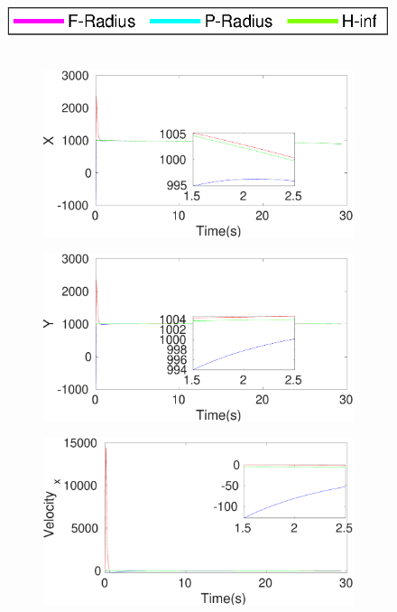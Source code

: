 \begin{figure}[h]
\includegraphics[scale=0.8]{figures/ratelegend}\\\\
\begin{subfigure}{.5\linewidth}
\centering
\includegraphics[width=\linewidth]{figures/HInf/s3caHInfX}
\end{subfigure}
\begin{subfigure}{.5\linewidth}
\centering
\includegraphics[width=\linewidth]{figures/HInf/s3caHInfY}
\end{subfigure}
\begin{subfigure}{.5\linewidth}
\centering
\includegraphics[width=\linewidth]{figures/HInf/s3caHInfVelocity_x}

\end{subfigure}
\end{figure}
